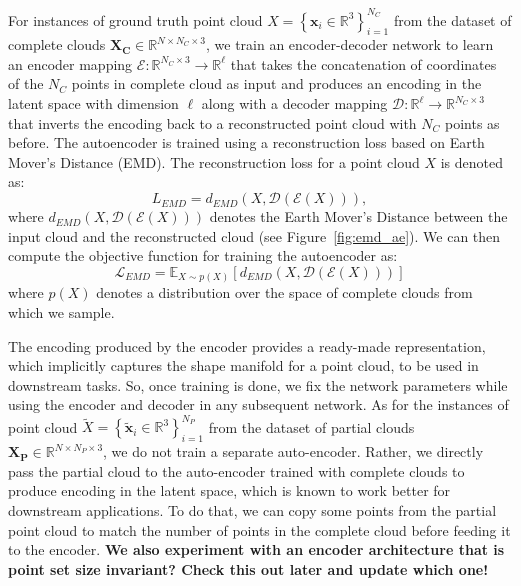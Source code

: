         For instances of ground truth point cloud $X=\left\{\mathbf{x}_{i} \in \mathbb{R}^{3}\right\}_{i=1}^{N_C}$ from the dataset of complete clouds $\mathbf{X_C} \in \mathbb{R}^{N \times N_C \times 3}$, we train an encoder-decoder network to learn an encoder mapping $\mathcal{E}: \mathbb{R}^{N_C \times 3} \rightarrow \mathbb{R}^{\ell}$ that takes the concatenation of coordinates of the $N_C$ points in complete cloud as input and produces an encoding in the latent space with dimension $\ell$ along with a decoder mapping $\mathcal{D}: \mathbb{R}^{\ell} \rightarrow \mathbb{R}^{N_C \times 3}$ that inverts the encoding back to a reconstructed point cloud with $N_C$ points as before. The autoencoder is trained using a reconstruction loss based on Earth Mover's Distance (EMD). The reconstruction loss for a point cloud $X$ is denoted as:
        \begin{equation}\label{emd_loss}
            L_{EMD} = d_{EMD}\left(X, \mathcal{D}(\mathcal{E}(X))\right),
        \end{equation}
        where $d_{EMD}\left(X, \mathcal{D}(\mathcal{E}(X))\right)$ denotes the Earth Mover's Distance between the input cloud and the reconstructed cloud (see Figure~\ref{fig:emd_ae}). We can then compute the objective function for training the autoencoder as:
        \begin{equation}\label{emd_obj}
            \mathcal{L}_{EMD} = \mathbb{E}_{X \sim p(X)} \left[d_{EMD}\left(X, \mathcal{D}(\mathcal{E}(X))\right)\right]
        \end{equation}
        where $p(X)$ denotes a distribution over the space of complete clouds from which we sample.

        The encoding produced by the encoder provides a ready-made representation, which implicitly captures the shape manifold for a point cloud, to be used in downstream tasks. So, once training is done, we fix the network parameters while using the encoder and decoder in any subsequent network. As for the instances of point cloud $\tilde{X}=\left\{\mathbf{\tilde{x}}_{i} \in \mathbb{R}^{3}\right\}_{i=1}^{N_P}$ from the dataset of partial clouds $\mathbf{X_P} \in \mathbb{R}^{N \times N_P \times 3}$, we do not train a separate auto-encoder. Rather, we directly pass the partial cloud to the auto-encoder trained with complete clouds to produce encoding in the latent space, which is known to work better for downstream applications. To do that, we can copy some points from the partial point cloud to match the number of points in the complete cloud before feeding it to the encoder. \textbf{\color{orange}We also experiment with an encoder architecture that is point set size invariant? Check this out later and update which one!}


